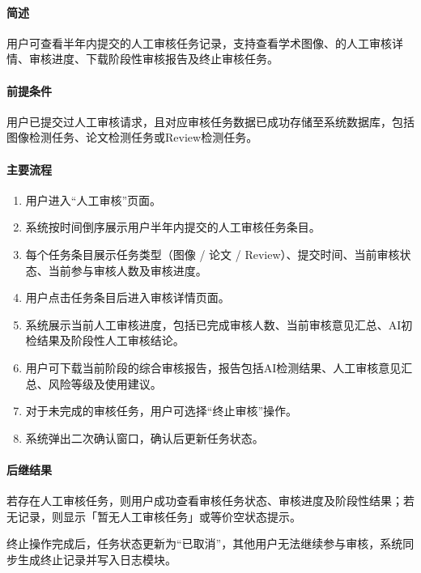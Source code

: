 \paragraph*{简述}

用户可查看半年内提交的人工审核任务记录，支持查看学术图像、的人工审核详情、审核进度、下载阶段性审核报告及终止审核任务。

\paragraph*{前提条件}

用户已提交过人工审核请求，且对应审核任务数据已成功存储至系统数据库，包括图像检测任务、论文检测任务或Review检测任务。

\paragraph*{主要流程}

\begin{enumerate}
    \item 用户进入“人工审核”页面。
    \item 系统按时间倒序展示用户半年内提交的人工审核任务条目。
    \item 每个任务条目展示任务类型（图像 / 论文 / Review）、提交时间、当前审核状态、当前参与审核人数及审核进度。
    \item 用户点击任务条目后进入审核详情页面。
    \item 系统展示当前人工审核进度，包括已完成审核人数、当前审核意见汇总、AI初检结果及阶段性人工审核结论。
    \item 用户可下载当前阶段的综合审核报告，报告包括AI检测结果、人工审核意见汇总、风险等级及使用建议。
    \item 对于未完成的审核任务，用户可选择“终止审核”操作。
    \item 系统弹出二次确认窗口，确认后更新任务状态。
\end{enumerate}

\paragraph*{后继结果}

若存在人工审核任务，则用户成功查看审核任务状态、审核进度及阶段性结果；若无记录，则显示「暂无人工审核任务」或等价空状态提示。

终止操作完成后，任务状态更新为“已取消”，其他用户无法继续参与审核，系统同步生成终止记录并写入日志模块。

